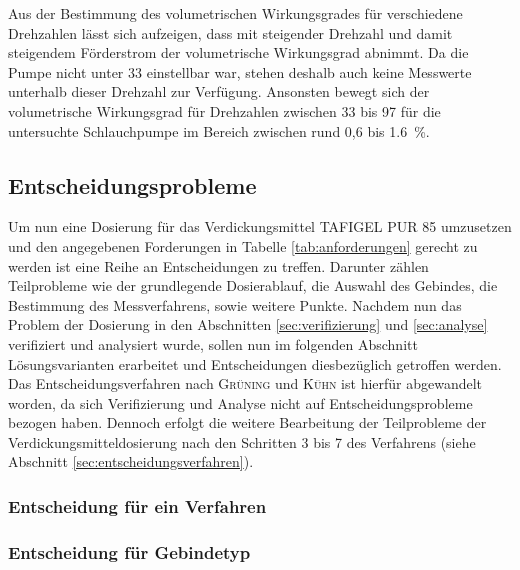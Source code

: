 Aus der Bestimmung des volumetrischen Wirkungsgrades für verschiedene Drehzahlen lässt sich aufzeigen, dass mit steigender Drehzahl und damit steigendem Förderstrom der volumetrische Wirkungsgrad abnimmt. Da die Pumpe nicht unter \SI{33}{\rpm} einstellbar war, stehen deshalb auch keine Messwerte unterhalb dieser Drehzahl zur Verfügung. Ansonsten bewegt sich der volumetrische Wirkungsgrad für Drehzahlen zwischen 33 bis \SI{97}{\rpm} für die untersuchte Schlauchpumpe im Bereich zwischen rund 0,6 bis \SI{1.6}{\percent}.

\subsection{Entscheidungsprobleme}
\label{subsec:entscheidungsprobleme}

Um nun eine Dosierung für das Verdickungsmittel TAFIGEL PUR 85 umzusetzen und den angegebenen Forderungen in Tabelle \ref{tab:anforderungen} gerecht zu werden ist eine Reihe an Entscheidungen zu treffen. Darunter zählen Teilprobleme wie der grundlegende Dosierablauf, die Auswahl des Gebindes, die Bestimmung des Messverfahrens, sowie weitere Punkte. Nachdem nun das Problem der Dosierung in den Abschnitten \ref{sec:verifizierung} und \ref{sec:analyse} verifiziert und analysiert wurde, sollen nun im folgenden Abschnitt Lösungsvarianten erarbeitet und Entscheidungen diesbezüglich getroffen werden. Das Entscheidungsverfahren nach \textsc{Grüning} und \textsc{Kühn} ist hierfür abgewandelt worden, da sich Verifizierung und Analyse nicht auf Entscheidungsprobleme bezogen haben. Dennoch erfolgt die weitere Bearbeitung der Teilprobleme der Verdickungsmitteldosierung nach den Schritten 3 bis 7 des Verfahrens (siehe Abschnitt \ref{sec:entscheidungsverfahren}). 

\subsubsection{Entscheidung für ein Verfahren}

\subsubsection{Entscheidung für Gebindetyp}

